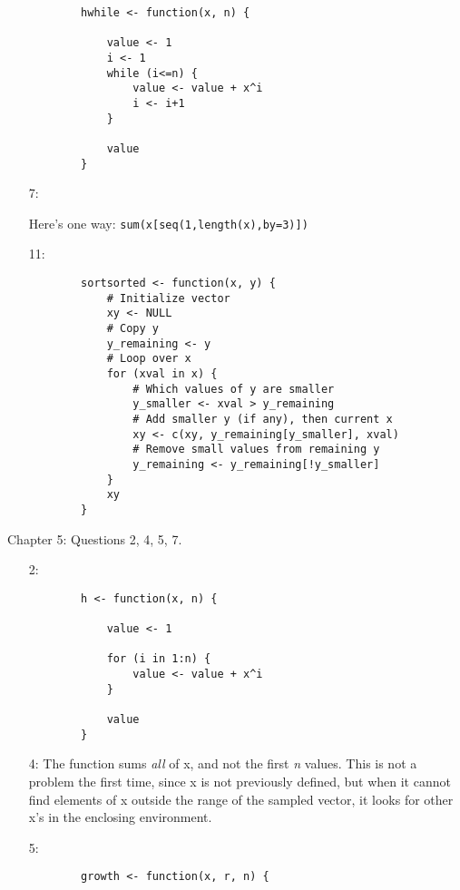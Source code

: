 \documentclass[11pt]{exam}
\begin{document}
\begin{questions}
\begin{enumerate}
	\begin{verbatim}
		hwhile <- function(x, n) {

		    value <- 1
		    i <- 1
		    while (i<=n) {
		        value <- value + x^i
		        i <- i+1
		    }

		    value
		}
	\end{verbatim}
	
	\item[7:]
	
	Here's one way: \verb!sum(x[seq(1,length(x),by=3)])!
	
	\item[11:]
	
	\begin{verbatim}
		sortsorted <- function(x, y) {
		    # Initialize vector
		    xy <- NULL
		    # Copy y
		    y_remaining <- y
		    # Loop over x
		    for (xval in x) {
		        # Which values of y are smaller
		        y_smaller <- xval > y_remaining
		        # Add smaller y (if any), then current x
		        xy <- c(xy, y_remaining[y_smaller], xval)  
		        # Remove small values from remaining y
		        y_remaining <- y_remaining[!y_smaller]
		    }
		    xy
		}
	\end{verbatim} 
	
\end{enumerate}

\question[11] Chapter 5: Questions 2, 4, 5, 7.

\begin{enumerate}
	\item[2:] 
	
	\begin{verbatim}
		h <- function(x, n) {

		    value <- 1

		    for (i in 1:n) {
		        value <- value + x^i
		    }

		    value
		}
	\end{verbatim}
	
	\item[4:] The function sums \emph{all} of x, and not the first \emph{n} values. This is not a problem the first time, since x is not previously defined, but when it cannot find elements of x outside the range of the sampled vector, it looks for other x's in the enclosing environment.
	
	
	\item[5:] 
	
	\begin{verbatim}
		growth <- function(x, r, n) {


\end{verbatim}
\end{enumerate}
\end{questions}
\end{document}
